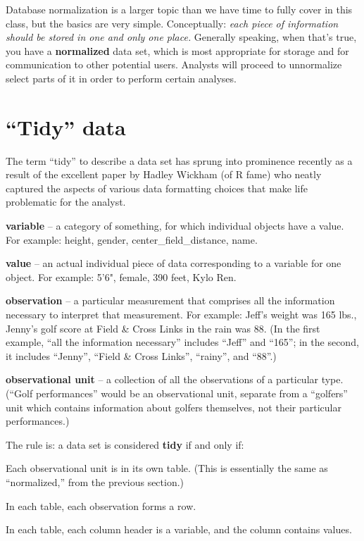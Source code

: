 \documentclass[12pt]{article}
\begin{document}
Database normalization is a larger topic than we have time to fully cover in
this class, but the basics are very simple. Conceptually: \textit{each piece
of information should be stored in one and only one place.} Generally
speaking, when that's true, you have a \textbf{normalized} data set, which is
most appropriate for storage and for communication to other potential users.
Analysts will proceed to unnormalize select parts of it in order to perform
certain analyses.

\section{``Tidy'' data}

The term ``tidy'' to describe a data set has sprung into prominence recently as
a result of the excellent paper by Hadley Wickham (of R fame) who neatly
captured the aspects of various data formatting choices that make life
problematic for the analyst. 

\begin{compactitem}
\item \textbf{variable} -- a category of something, for which individual
objects have a value. For example: height, gender, center\_field\_distance,
name.
\item \textbf{value} -- an actual individual piece of data corresponding to a
variable for one object. For example: 5'6", female, 390 feet, Kylo Ren.
\item \textbf{observation} -- a particular measurement that comprises all the
information necessary to interpret that measurement. For example: Jeff's
weight was 165 lbs., Jenny's golf score at Field \& Cross Links in the rain
was 88. (In the first example, ``all the information necessary'' includes
``Jeff'' and ``165''; in the second, it includes ``Jenny'', ``Field \& Cross
Links'', ``rainy'', and ``88''.)
\item \textbf{observational unit} -- a collection of all the observations of a
particular type. (``Golf performances'' would be an observational unit,
separate from a ``golfers'' unit which contains information about golfers
themselves, not their particular performances.)
\end{compactitem}

\vspace{.2in}
The rule is: a data set is considered \textbf{tidy} if and only if:
\begin{compactenum}
\item Each observational unit is in its own table. (This is essentially
the same as ``normalized,'' from the previous section.)
\item In each table, each observation forms a row.
\item In each table, each column header is a variable, and the column contains
values.
\end{compactenum}
\end{document}
